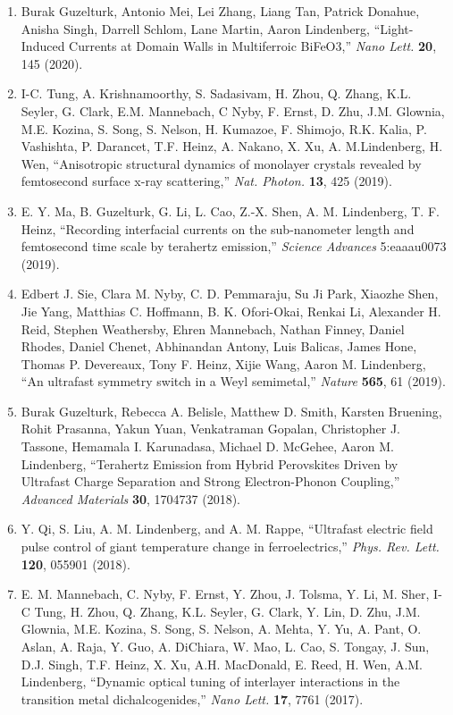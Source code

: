 \begin{enumerate}
    \item Burak Guzelturk, Antonio Mei, Lei Zhang, Liang Tan, Patrick Donahue, Anisha Singh, Darrell Schlom, Lane Martin, Aaron Lindenberg, “Light-Induced Currents at Domain Walls in Multiferroic BiFeO3,” {\it Nano Lett.} {\bf 20}, 145 (2020). 
    \item I-C. Tung, A. Krishnamoorthy, S. Sadasivam, H. Zhou, Q. Zhang, K.L. Seyler, G. Clark, E.M. Mannebach, C Nyby, F. Ernst, D. Zhu, J.M. Glownia, M.E. Kozina, S. Song, S. Nelson, H. Kumazoe, F. Shimojo, R.K. Kalia, P. Vashishta, P. Darancet, T.F. Heinz, A. Nakano, X. Xu, A. M.Lindenberg, H. Wen, “Anisotropic structural dynamics of monolayer crystals revealed by femtosecond surface x-ray scattering,” {\it Nat. Photon.} {\bf 13}, 425 (2019).
    \item E. Y. Ma, B. Guzelturk, G. Li, L. Cao, Z.-X. Shen, A. M. Lindenberg, T. F. Heinz, “Recording interfacial currents on the sub-nanometer length and femtosecond time scale by terahertz emission,” {\it Science Advances} 5:eaaau0073 (2019).
    \item Edbert J. Sie, Clara M. Nyby, C. D. Pemmaraju, Su Ji Park, Xiaozhe Shen, Jie Yang, Matthias C. Hoffmann, B. K. Ofori-Okai, Renkai Li, Alexander H. Reid, Stephen Weathersby, Ehren Mannebach, Nathan Finney, Daniel Rhodes, Daniel Chenet, Abhinandan Antony, Luis Balicas, James Hone, Thomas P. Devereaux, Tony F. Heinz, Xijie Wang, Aaron M. Lindenberg, “An ultrafast symmetry switch in a Weyl semimetal,” {\it Nature} {\bf 565}, 61 (2019).
    \item Burak Guzelturk, Rebecca A. Belisle, Matthew D. Smith, Karsten Bruening, Rohit Prasanna, Yakun Yuan, Venkatraman Gopalan, Christopher J. Tassone, Hemamala I. Karunadasa, Michael D. McGehee, Aaron M. Lindenberg, “Terahertz Emission from Hybrid Perovskites Driven by Ultrafast Charge Separation and Strong Electron-Phonon Coupling,” {\it Advanced Materials} {\bf 30}, 1704737 (2018). 
    \item Y. Qi, S. Liu, A. M. Lindenberg, and A. M. Rappe, “Ultrafast electric field pulse control of giant temperature change in ferroelectrics,” {\it Phys. Rev. Lett.} {\bf 120}, 055901 (2018).
    \item E. M. Mannebach, C. Nyby, F. Ernst, Y. Zhou, J. Tolsma, Y. Li, M. Sher, I-C Tung, H. Zhou, Q. Zhang, K.L. Seyler, G. Clark, Y. Lin, D. Zhu, J.M. Glownia, M.E. Kozina, S. Song, S. Nelson, A. Mehta, Y. Yu, A. Pant, O. Aslan, A. Raja, Y. Guo, A. DiChiara, W. Mao, L. Cao, S. Tongay, J. Sun, D.J. Singh, T.F. Heinz, X. Xu, A.H. MacDonald, E. Reed, H. Wen, A.M. Lindenberg, “Dynamic optical tuning of interlayer interactions in the transition metal dichalcogenides,” {\it Nano Lett.} {\bf 17}, 7761 (2017).

\end{enumerate}
